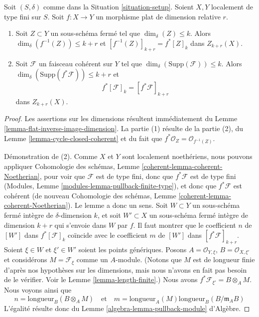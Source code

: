 \begin{lemma}
\label{lemma-pullback-coherent}
Soit $(S, \delta)$ comme dans la Situation \ref{situation-setup}.
Soient $X, Y$ localement de type fini sur $S$.
Soit $f : X \to Y$ un morphisme plat de dimension relative $r$.
\begin{enumerate}
\item Soit $Z \subset Y$ un sous-schéma fermé tel que
$\dim_\delta(Z) \leq k$. Alors
$\dim_\delta(f^{-1}(Z)) \leq k + r$
et $[f^{-1}(Z)]_{k + r} = f^*[Z]_k$ dans $Z_{k + r}(X)$.
\item Soit $\mathcal{F}$ un faisceau cohérent sur $Y$ tel que
$\dim_\delta(\text{Supp}(\mathcal{F})) \leq k$.
Alors $\dim_\delta(\text{Supp}(f^*\mathcal{F})) \leq k + r$
et
$$
f^*[{\mathcal F}]_k = [f^*{\mathcal F}]_{k+r}
$$
dans $Z_{k + r}(X)$.
\end{enumerate}
\end{lemma}

\begin{proof}
Les assertions sur les dimensions résultent immédiatement du
Lemme \ref{lemma-flat-inverse-image-dimension}.
La partie (1) résulte de la partie (2), du Lemme \ref{lemma-cycle-closed-coherent}
et du fait que $f^*\mathcal{O}_Z = \mathcal{O}_{f^{-1}(Z)}$.

\medskip\noindent
Démonstration de (2).
Comme $X$ et $Y$ sont localement noethériens, nous pouvons appliquer
Cohomologie des schémas, Lemme \ref{coherent-lemma-coherent-Noetherian}, pour voir
que $\mathcal{F}$ est de type fini, donc que $f^*\mathcal{F}$ est
de type fini (Modules, Lemme \ref{modules-lemma-pullback-finite-type}),
et donc que $f^*\mathcal{F}$ est cohérent
(de nouveau Cohomologie des schémas, Lemme \ref{coherent-lemma-coherent-Noetherian}).
Le lemme a donc un sens. Soit $W \subset Y$ un sous-schéma fermé intègre
de $\delta$-dimension $k$, et soit $W' \subset X$ un sous-schéma fermé
intègre de dimension $k + r$ qui s'envoie dans $W$
par $f$. Il faut montrer que le coefficient $n$ de
$[W']$ dans $f^*[{\mathcal F}]_k$ coïncide avec le coefficient
$m$ de $[W']$ dans $[f^*{\mathcal F}]_{k+r}$. Soient $\xi \in W$ et
$\xi' \in W'$ soient les points génériques. Posons
$A = \mathcal{O}_{Y, \xi}$, $B = \mathcal{O}_{X, \xi'}$
et considérons $M = \mathcal{F}_\xi$ comme un $A$-module. (Notons que
$M$ est de longueur finie d'après nos hypothèses sur les dimensions, mais nous
n'avons en fait pas besoin de le vérifier. Voir le
Lemme \ref{lemma-length-finite}.)
Nous avons $f^*\mathcal{F}_{\xi'} = B \otimes_A M$.
Nous voyons ainsi que
$$
n = \text{longueur}_B(B \otimes_A M)
\quad
\text{et}
\quad
m = \text{longueur}_A(M) \text{longueur}_B(B/\mathfrak m_AB)
$$
L'égalité résulte donc du
Lemme \ref{algebra-lemma-pullback-module} d'Algèbre.
\end{proof}



